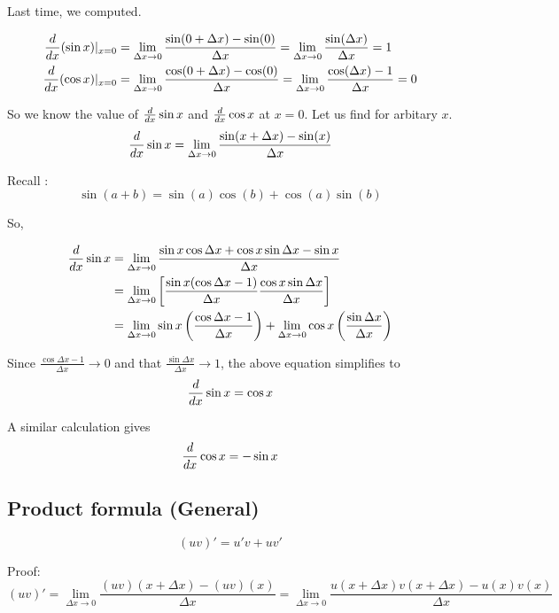 Last time, we computed.

\begin{equation*}
\begin{split}
	\frac{d{}}{d{x}} (\sin x) |_{\substack{x=0}} & = 
		\lim_{\Delta x \to 0} \frac{\sin(0 + \Delta x) - \sin(0) }{\Delta x} = 
		\lim_{\Delta x \to 0} \frac{\sin(\Delta x)}{\Delta x} = 1 \\
	\frac{d{}}{d{x}} (\cos x) |_{\substack{x=0}} & = 
        \lim_{\Delta x \to 0} \frac{\cos(0 + \Delta x) - \cos(0) }{\Delta x} = 
        \lim_{\Delta x \to 0} \frac{\cos(\Delta x)-1}{\Delta x} = 0 \\
\end{split}
\end{equation*}

So we know the value of $\frac{d{}}{d{x}} \sin x$ and $\frac{d{}}{d{x}} \cos x$ at $x = 0$. Let us find for arbitary $x$.
$$\frac{d{}}{d{x}} \sin x = \lim_{\Delta x \to 0} \frac{\sin(x+\Delta x) - \sin(x)}{\Delta x}$$

Recall : $$\sin(a+b) = \sin(a)\cos(b) + \cos(a)\sin(b)$$

So,

\begin{equation*}
\begin{split}
	\frac{d{}}{d{x}} \sin x 
		& = \lim_{\Delta x \to 0} \frac{\sin x \cos \Delta x + \cos x \sin \Delta x - \sin x}{\Delta x} \\
		& = \lim_{\Delta x \to 0} \left[ \frac{\sin x (\cos \Delta x - 1)}{\Delta x} \frac{\cos x \sin \Delta x}{\Delta x} \right] \\
		& = \lim_{\Delta x \to 0} \sin x \left( \frac{\cos \Delta x - 1}{\Delta x} \right) + \lim_{\Delta x \to 0} \cos x \left( \frac{\sin \Delta x}{\Delta x} \right)
\end{split}
\end{equation*}

Since $\frac{\cos \Delta x - 1}{\Delta x} \to 0$ and that $\frac{\sin \Delta x}{\Delta x} \to 1$, the above equation simplifies to $$\frac{d{}}{d{x}} \sin x = \cos x$$

A similar calculation gives
$$\frac{d{}}{d{x}} \cos x = - \sin x$$


\subsection{Product formula (General)}

$$(uv)' = u'v+uv'$$

Proof:
$$(uv)' = \lim_{\Delta x \to 0} \frac{(uv)(x+\Delta x) - (uv)(x)}{\Delta x}
		= \lim_{\Delta x \to 0} \frac{u(x+\Delta x)v(x+\Delta x) - u(x)v(x)}{\Delta x}$$

